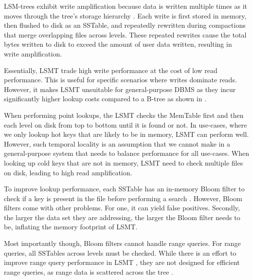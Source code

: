 
LSM-trees exhibit write amplification because data is written multiple times as it moves through the tree's storage hierarchy \cite{kuszmaul2014fractal}.
Each write is first stored in memory, then flushed to disk as an SSTable, and repeatedly rewritten during compactions that merge overlapping files across levels. 
These repeated rewrites cause the total bytes written to disk to exceed the amount of user data written, resulting in write amplification.

Essentially, \ac{LSMT} trade high write performance at the cost of low read performance.
This is useful for specific scenarios where writes dominate reads.
However, it makes \ac{LSMT} unsuitable for general-purpose \ac{DBMS} as they incur significantly higher lookup costs compared to a B-tree as shown in \cite{gorrod2017wiredtiger}.

When performing point lookups, the \ac{LSMT} checks the MemTable first and then each level on disk from top to bottom until it is found or not.
In use-cases, where we only lookup hot keys that are likely to be in memory, \ac{LSMT} can perform well.
However, such temporal locality is an assumption that we cannot make in a general-purpose system that needs to balance performance for all use-cases.
When looking up cold keys that are not in memory, \ac{LSMT} need to check multiple files on disk, leading to high read amplification.

To improve lookup performance, each SSTable has an in-memory Bloom filter to check if a key is present in the file before performing a search \cite{chang2008bigtable}.
However, Bloom filters come with other problems. 
For one, it can yield false positives.
Secondly, the larger the data set they are addressing, the larger the Bloom filter needs to be, inflating the memory footprint of \ac{LSMT}.

Most importantly though, Bloom filters cannot handle range queries.
For range queries, all SSTables across levels must be checked. 
While there is an effort to improve range query performance in \ac{LSMT} \cite{zhong2021remix}, they are not designed for efficient range queries, as range data is scattered across the tree \cite{sarkar2022lsmt}.

